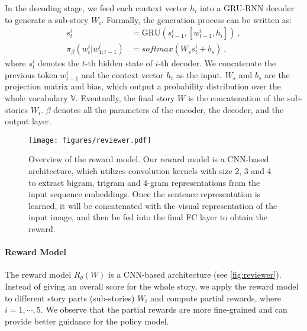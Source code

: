 \documentclass[11pt,a4paper]{article}
\begin{document}
In the decoding stage, we feed each context vector $h_i$ into a GRU-RNN decoder to generate a sub-story $W_i$. 
Formally, the generation process can be written as:
\begin{align}
s^i_t &= \text{GRU}(s^i_{t-1}, [w^i_{t-1}, h_i]) ~,    \\
\pi_{\beta}(w^i_{t}|w^i_{1:t-1}) &= softmax(W_s s^i_t + b_s) ~,
\end{align}
where $s^i_t$ denotes the $t$-th hidden state of $i$-th decoder. We concatenate the previous token $w^i_{t-1}$ and the context vector $h_i$ as the input. $W_s$ and $b_s$ are the projection matrix and bias, which output a probability distribution over the whole vocabulary $\mathbb{V}$. Eventually, the final story $W$ is the concatenation of the sub-stories $W_i$. $\beta$ denotes all the parameters of the encoder, the decoder, and the output layer.

\begin{figure}[!t]
\begin{center}
\texttt{[image: figures/reviewer.pdf]}  
\end{center}
\caption{Overview of the reward model. Our reward model is a CNN-based architecture, which utilizes convolution kernels with size 2, 3 and 4 to extract bigram, trigram and 4-gram representations from the input sequence embeddings. Once the sentence representation is learned, it will be concatenated with the visual representation of the input image, and then be fed into the final FC layer to obtain the reward.}
\label{fig:reviewer}
\end{figure}

\paragraph{Reward Model} The reward model $R_{\theta}(W)$ is a CNN-based architecture (see \autoref{fig:reviewer}).  
Instead of giving an overall score for the whole story, we apply the reward model to different story parts (sub-stories) $W_i$ and compute partial rewards, where $i = 1,\cdots, 5$. We observe that the partial rewards are more fine-grained and can provide better guidance for the policy model. 
\end{document}
